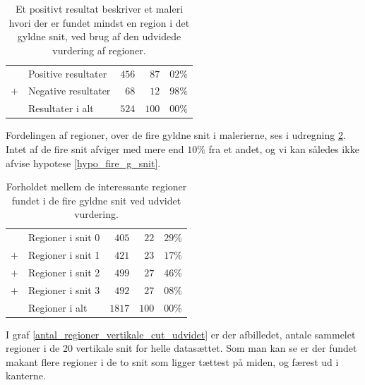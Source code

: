 {\begin{table}[H]
    \centering
    \begin{tabular}{r@{\ \ }p{12em}r|r@{.}l}
            & Positive resultater   & $456$ &  $87$ & $02\%$ \\
        $+$ & Negative resultater   &  $68$ &  $12$ & $98\%$ \\\hline
            & Resultater i alt      & $524$ & $100$ & $00\%$
    \end{tabular}
    \caption[]{Et positivt resultat beskriver et maleri hvori der er
    fundet mindst en region i det gyldne snit, ved brug af den udvidede
    vurdering af regioner.}
    \label{ud_tabel_fordeling}
\end{table}

Fordelingen af regioner, over de fire gyldne snit i malerierne, ses i
udregning \ref{ud_tabel_fire_snit}. Intet af de fire snit afviger med
mere end $10\%$ fra et andet, og vi kan således ikke afvise hypotese
\ref{hypo_fire_g_snit}.

\begin{table}[H]
    \centering
    \begin{tabular}{r@{\ \ }p{12em}r|r@{.}l}
            & Regioner i snit 0   &  $405$ &  $22$ & $29\%$ \\
        $+$ & Regioner i snit 1   &  $421$ &  $23$ & $17\%$ \\
        $+$ & Regioner i snit 2   &  $499$ &  $27$ & $46\%$ \\
        $+$ & Regioner i snit 3   &  $492$ &  $27$ & $08\%$ \\\hline
            & Regioner i alt      & $1817$ & $100$ & $00\%$
    \end{tabular}
    \caption[]{Forholdet mellem de interessante regioner fundet i de
    fire gyldne snit ved udvidet vurdering.}
    \label{ud_tabel_fire_snit}
\end{table}


I graf \ref{antal_regioner_vertikale_cut_udvidet} er der afbilledet,
antale sammelet regioner i de 20 vertikale snit for helle datasættet.
Som man kan se er der fundet makant flere regioner i de to snit som
ligger tættest på miden, og færest ud i kanterne. 

}
